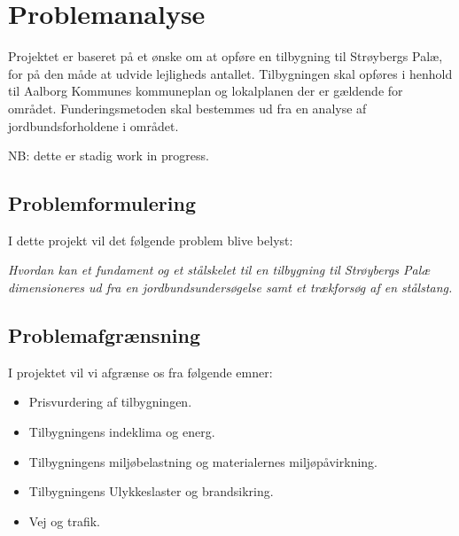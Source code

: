 \chapter{Problemanalyse}
Projektet er baseret på et ønske om at opføre en tilbygning til Strøybergs Palæ, for på den måde at udvide lejligheds antallet. Tilbygningen skal opføres i henhold til Aalborg Kommunes kommuneplan og lokalplanen der er gældende for området. Funderingsmetoden skal bestemmes ud fra en analyse af jordbundsforholdene i området.

 
NB: dette er stadig work in progress.


\section{Problemformulering}
I dette projekt vil det følgende problem blive belyst:

\textit{Hvordan kan et fundament og et stålskelet til en tilbygning til Strøybergs Palæ dimensioneres ud fra en jordbundsundersøgelse samt et trækforsøg af en stålstang.}

\section{Problemafgrænsning}
I projektet vil vi afgrænse os fra følgende emner:

\begin{itemize}
\item Prisvurdering af tilbygningen.
\item Tilbygningens indeklima og energ.
\item Tilbygningens miljøbelastning og materialernes miljøpåvirkning.
\item Tilbygningens Ulykkeslaster og brandsikring.
\item Vej og trafik.
\end{itemize}
